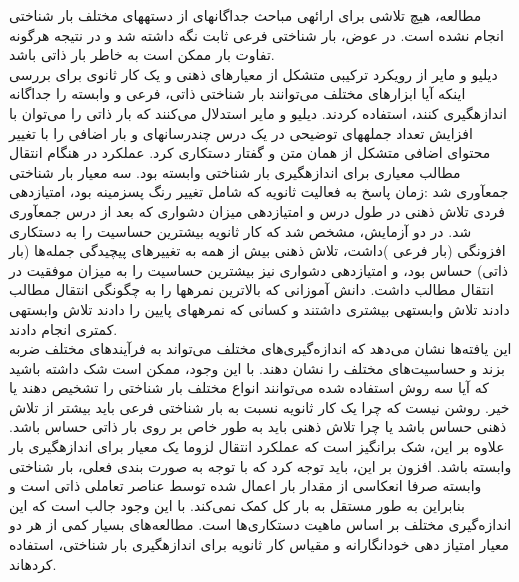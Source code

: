 مطالعه، هيچ تلاشی برای ارائهی مباحث جداگانهای از دستههای مختلف بار شناختی انجام نشده است. 
در عوض، بار شناختی فرعی ثابت نگه داشته شد و در نتيجه هرگونه تفاوت بار ممکن است به خاطر بار 
ذاتی باشد.
\cite{ayres2006using}
\\
دیليو و مایر از رویکرد تركيبی متشکل از معيارهای ذهنی و یک كار ثانوی برای بررسی اینکه آیا ابزارهای
مختلف می‌توانند بار شناختی ذاتی، فرعی و وابسته را جداگانه اندازهگيری كنند، استفاده كردند. دیليو و 
مایر استدلال می‌كنند كه  بار  ذاتی را  می‌توان با  افزایش تعداد  جملههای توضيحی در  یک درس 
چندرسانهای و بار اضافی را با تغيير محتوای اضافی متشکل از همان متن و گفتار دستكاری كرد. عملکرد 
در هنگام انتقال مطالب معياری برای اندازهگيری بار شناختی وابسته بود. سه معيار بار شناختی جمعآوری
شد :زمان پاسخ به فعاليت ثانویه كه شامل تغيير رنگ پسزمينه بود، امتيازدهی فردی تلاش ذهنی در طول 
درس و امتيازدهی ميزان دشواری كه بعد از درس جمعآوری شد. در دو آزمایش، مشخص شد كه كار ثانویه
بيشترین حساسيت را  به دستكاری افزونگی (بار فرعی )داشت، تلاش ذهنی بيش از همه به تغييرهای
پيچيدگی جمله‌ها (بار  ذاتی) حساس  بود،  و  امتيازدهی دشواری نيز بيشترین حساسيت را  به  ميزان
موفقيت در انتقال مطالب داشت. دانش آموزانی كه بالاترین نمرهها را به چگونگی انتقال مطالب دادند
تلاش  وابستهی بيشتری داشتند  و  كسانی كه  نمرههای پایين را  دادند  تلاش  وابستهی كمتری انجام 
دادند.
\cite{deleeuw2008comparison}
\\
این یافته‌ها نشان  می‌دهد كه  اندازه‌گيری‌های مختلف  می‌تواند به  فرآیندهای مختلف  ضربه  بزند  و 
حساسيت‌های مختلف را نشان دهند. با این وجود، ممکن است شک داشته باشيد كه آیا سه روش استفاده شده می‌توانند انواع مختلف بار شناختی را تشخيص دهند یا خير. روشن نيست كه چرا  یک كار ثانویه
نسبت به بار شناختی فرعی باید بيشتر از تلاش ذهنی حساس باشد یا چرا تلاش ذهنی باید به طور خاص 
بر روی بار ذاتی حساس باشد. علاوه بر این، شک برانگيز است كه عملکرد انتقال لزوما یک معيار برای
اندازهگيری بار وابسته باشد. افزون بر این، باید توجه كرد كه با توجه به صورت بندی فعلی، بار شناختی
وابسته صرفا انعکاسی از مقدار بار اعمال شده توسط عناصر تعاملی ذاتی است و بنابراین به طور مستقل به 
بار كل كمک نمی‌كند. با این وجود جالب است كه این اندازه‌گيری مختلف بر اساس ماهيت دستكاری‌ها
است. مطالعه‌های بسيار كمی از هر دو معيار امتياز دهی خودانگارانه و مقياس كار ثانویه برای اندازهگيری
بار شناختی، استفاده كردهاند.
\cite{antonenko2010using}
\\

